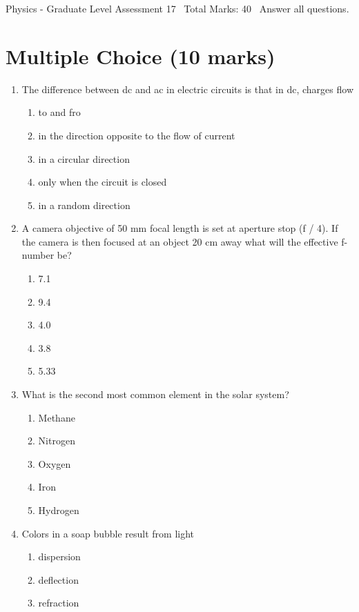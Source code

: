 \documentclass[12pt]{article}
\begin{document}
\begin{center}
Physics - Graduate Level Assessment 17 \
Total Marks: 40 \
Answer all questions.
\end{center}

\section*{Multiple Choice (10 marks)}
\begin{enumerate}[label=\arabic*.]
\item The difference between dc and ac in electric circuits is that in dc, charges flow
\begin{enumerate}[label=(\alph*)]
    \item to and fro
    \item in the direction opposite to the flow of current
    \item in a circular direction
    \item only when the circuit is closed
    \item in a random direction
\end{enumerate}
\item A camera objective of 50 mm focal length is set at aperture stop (f / 4). If the camera is then focused at an object 20 cm away what will the effective f-number be?
\begin{enumerate}[label=(\alph*)]
    \item 7.1
    \item 9.4
    \item 4.0
    \item 3.8
    \item 5.33
\end{enumerate}
\item What is the second most common element in the solar system?
\begin{enumerate}[label=(\alph*)]
    \item Methane
    \item Nitrogen
    \item Oxygen
    \item Iron
    \item Hydrogen
\end{enumerate}
\item Colors in a soap bubble result from light
\begin{enumerate}[label=(\alph*)]
    \item dispersion
    \item deflection
    \item refraction

\end{enumerate}
\end{enumerate}
\end{document}
